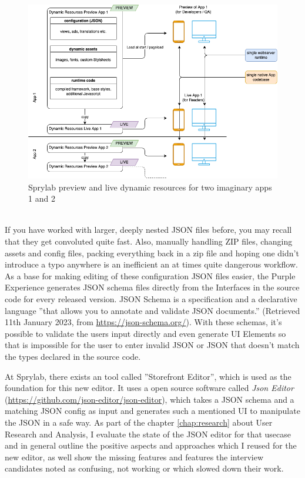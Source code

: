 \begin{figure}[h]
  \includegraphics[width=\linewidth]{pics/experience_resources.drawio.png}
  \caption{Sprylab preview and live dynamic resources for two imaginary apps 1 and 2}
  \label{fig:dynres}
\end{figure}
\\
If you have worked with larger, deeply nested JSON files before, you may recall that they get convoluted quite fast.
Also, manually handling ZIP files, changing assets and config files, packing everything back in a zip file and hoping one didn't introduce a typo anywhere is an inefficient an at times quite dangerous workflow.
\\
As a base for making editing of these configuration JSON files easier, the Purple Experience generates JSON schema files directly from the Interfaces in the source code for every released version.
JSON Schema is a specification and a declarative language ''that allows you to annotate and validate JSON documents.'' (Retrieved 11th January 2023, from \url{https://json-schema.org/}).
With these schemas, it's possible to validate the users input directly and even generate UI Elements so that is impossible for the user to enter invalid JSON or JSON that doesn't match the
types declared in the source code.

At Sprylab, there exists an tool called ''Storefront Editor'', which is used as the foundation for this new editor.
It uses a open source software called \textit{Json Editor} (\url{https://github.com/json-editor/json-editor}), which takes a JSON schema and a matching JSON config as input and generates such a mentioned UI to manipulate the JSON in a safe way.
As part of the chapter \ref{chap:research} about User Research and Analysis, I evaluate the state of the JSON editor for that usecase and in general outline the positive aspects and approaches which I reused for the new editor,
as well show the missing features and features the interview candidates noted as confusing, not working or which slowed down their work.

